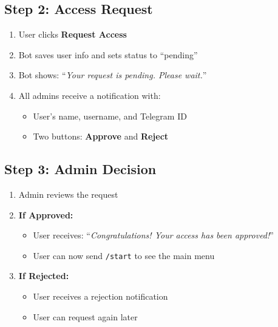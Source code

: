 \subsection{Step 2: Access Request}
\begin{enumerate}
    \item User clicks \textbf{Request Access}
    \item Bot saves user info and sets status to ``pending''
    \item Bot shows: ``\textit{Your request is pending. Please wait.}''
    \item All admins receive a notification with:
    \begin{itemize}
        \item User's name, username, and Telegram ID
        \item Two buttons: \textbf{Approve} and \textbf{Reject}
    \end{itemize}
\end{enumerate}

\subsection{Step 3: Admin Decision}
\begin{enumerate}
    \item Admin reviews the request
    \item \textbf{If Approved:}
    \begin{itemize}
        \item User receives: ``\textit{Congratulations! Your access has been approved!}''
        \item User can now send \texttt{/start} to see the main menu
    \end{itemize}
    \item \textbf{If Rejected:}
    \begin{itemize}
        \item User receives a rejection notification
        \item User can request again later
    \end{itemize}
\end{enumerate}

